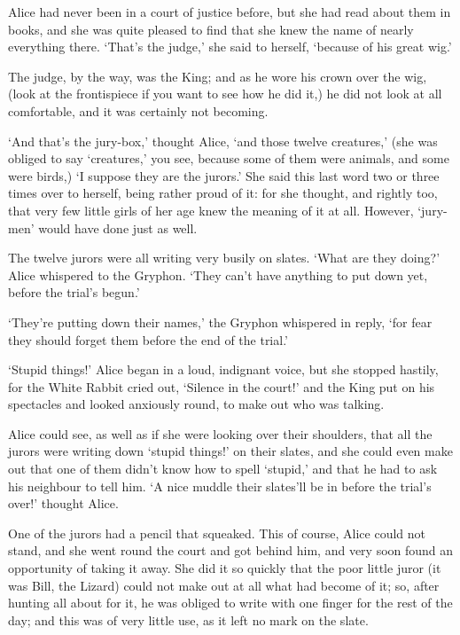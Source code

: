   Alice had never been in a court of justice before, but she had
read about them in books, and she was quite pleased to find that
she knew the name of nearly everything there.  `That's the
judge,' she said to herself, `because of his great wig.'

  The judge, by the way, was the King; and as he wore his crown
over the wig, (look at the frontispiece if you want to see how he
did it,) he did not look at all comfortable, and it was certainly
not becoming.

  `And that's the jury-box,' thought Alice, `and those twelve
creatures,' (she was obliged to say `creatures,' you see, because
some of them were animals, and some were birds,) `I suppose they
are the jurors.'  She said this last word two or three times over
to herself, being rather proud of it:  for she thought, and
rightly too, that very few little girls of her age knew the
meaning of it at all.  However, `jury-men' would have done just
as well.

  The twelve jurors were all writing very busily on slates.
`What are they doing?'  Alice whispered to the Gryphon.  `They
can't have anything to put down yet, before the trial's begun.'

  `They're putting down their names,' the Gryphon whispered in
reply, `for fear they should forget them before the end of the
trial.'

  `Stupid things!' Alice began in a loud, indignant voice, but
she stopped hastily, for the White Rabbit cried out, `Silence in
the court!' and the King put on his spectacles and looked
anxiously round, to make out who was talking.

  Alice could see, as well as if she were looking over their
shoulders, that all the jurors were writing down `stupid things!'
on their slates, and she could even make out that one of them
didn't know how to spell `stupid,' and that he had to ask his
neighbour to tell him.  `A nice muddle their slates'll be in
before the trial's over!' thought Alice.

  One of the jurors had a pencil that squeaked.  This of course,
Alice could not stand, and she went round the court and got
behind him, and very soon found an opportunity of taking it
away.  She did it so quickly that the poor little juror (it was
Bill, the Lizard) could not make out at all what had become of
it; so, after hunting all about for it, he was obliged to write
with one finger for the rest of the day; and this was of very
little use, as it left no mark on the slate.

